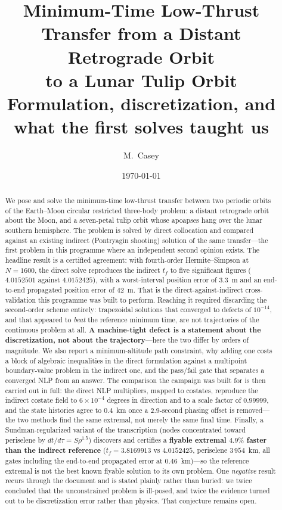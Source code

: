 \documentclass[11pt]{article}
\title{Minimum-Time Low-Thrust Transfer from a Distant Retrograde Orbit\\
       to a Lunar Tulip Orbit\\
       \large Formulation, discretization, and what the first solves taught us}
\author{M.\ Casey}
\date{\today}
\begin{document}
\maketitle

\begin{abstract}
We pose and solve the minimum-time low-thrust transfer between two periodic
orbits of the Earth--Moon circular restricted three-body problem: a distant
retrograde orbit about the Moon, and a seven-petal tulip orbit whose apoapses
hang over the lunar southern hemisphere. The problem is solved by direct
collocation and compared against an existing indirect (Pontryagin shooting)
solution of the same transfer---the first problem in this programme where an
independent second opinion exists. The headline result is a certified
agreement: with fourth-order Hermite--Simpson at $N = 1600$, the direct solve
reproduces the indirect $t_f$ to five significant figures ($4.0152501$ against
$4.0152425$), with a worst-interval position error of $3.3$~m and an end-to-end
propagated position error of $42$~m. That is the direct-against-indirect
cross-validation this programme was built to perform. Reaching it required
discarding the second-order scheme entirely: trapezoidal solutions that
converged to defects of $10^{-14}$, and that appeared to \emph{beat} the
reference minimum time, are not trajectories of the continuous problem at all.
\textbf{A machine-tight defect is a statement about the discretization, not
about the trajectory}---here the two differ by orders of magnitude. We also
report a minimum-altitude path constraint, why adding one costs a block of
algebraic inequalities in the direct formulation against a multipoint
boundary-value problem in the indirect one, and the pass/fail gate that
separates a converged NLP from an answer. The comparison the campaign was built
for is then carried out in full: the direct NLP multipliers, mapped to costates,
reproduce the indirect costate field to $6\times10^{-4}$ degrees in direction
and to a scale factor of $0.99999$, and the state histories agree to $0.4$~km
once a $2.9$-second phasing offset is removed---the two methods find the same
extremal, not merely the same final time. Finally, a Sundman-regularized variant of the
transcription (nodes concentrated toward periselene by $dt/d\tau = S\rho^{1.5}$)
discovers and certifies a \textbf{flyable extremal $4.9\%$ faster than the
indirect reference} ($t_f = 3.8169913$ vs $4.0152425$, periselene $3\,954$~km,
all gates including the end-to-end propagated error at $0.46$~km)---so the
reference extremal is not the best known flyable solution to its own problem.
One \emph{negative} result recurs through the document and is stated plainly
rather than buried: we twice concluded that the unconstrained problem is
ill-posed, and twice the evidence turned out to be discretization error rather
than physics. That conjecture remains open.
\end{abstract}
\end{document}

